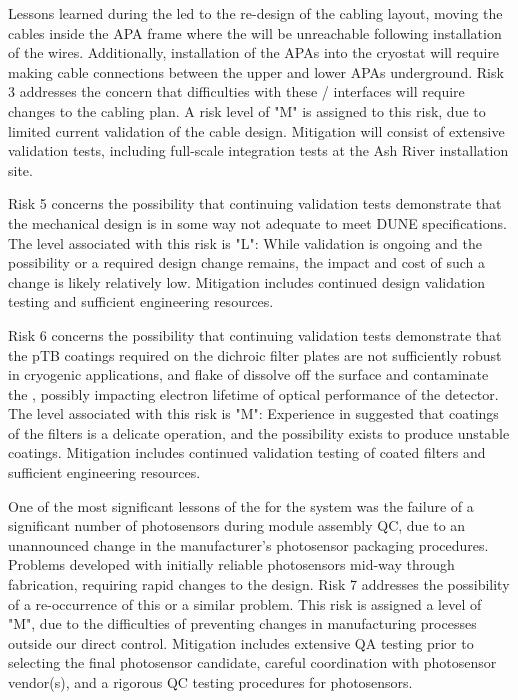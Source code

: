 Lessons learned during the  led to the re-design of the  cabling layout, moving the cables inside the APA frame where the will be unreachable following installation of the  wires.  Additionally, installation of the APAs into the cryostat will require making  cable connections between the upper and lower APAs underground.  Risk 3 addresses the concern that difficulties with these / interfaces will require changes to the cabling plan.  A risk level of "M" is assigned to this risk, due to limited current validation of the cable design.  Mitigation will consist of extensive validation tests, including full-scale integration tests at the Ash River installation site.

Risk 5 concerns the possibility that continuing validation tests demonstrate that the  mechanical design is in some way not adequate to meet DUNE specifications.  The level associated with this risk is "L":  While validation is ongoing and the possibility or a required design change remains, the impact and cost of such a change is likely relatively low.  Mitigation includes continued design validation testing and sufficient engineering resources.

Risk 6 concerns the possibility that continuing validation tests demonstrate that the pTB coatings required on the dichroic filter plates are not sufficiently robust in cryogenic applications, and flake of dissolve off the surface and contaminate the , possibly impacting electron lifetime of optical performance of the detector.  The level associated with this risk is "M":  Experience in  suggested that coatings of the filters is a delicate operation, and the possibility exists to produce unstable coatings.  Mitigation includes continued validation testing of coated filters and sufficient engineering resources.

One of the most significant lessons of the  for the  system was the failure of a significant number of photosensors during module assembly QC, due to an unannounced change in the manufacturer's photosensor packaging procedures.  Problems developed with initially reliable photosensors mid-way through fabrication, requiring rapid changes to the  design.  Risk 7 addresses the possibility of a re-occurrence of this or a similar problem.  This risk is assigned a level of "M", due to the difficulties of preventing changes in manufacturing processes outside our direct control.  Mitigation includes extensive QA testing prior to selecting the final photosensor candidate, careful coordination with photosensor vendor(s), and a rigorous QC testing procedures for photosensors.

